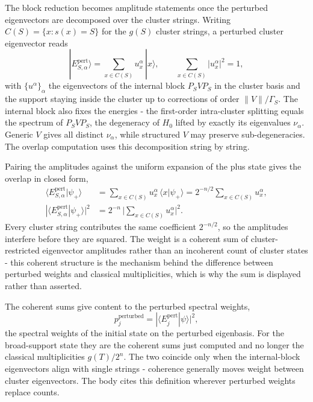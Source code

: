 The block reduction becomes amplitude statements once the perturbed eigenvectors are decomposed over the cluster strings. Writing $C(S) = \{ x : s(x) = S \}$ for the $g(S)$ cluster strings, a perturbed cluster eigenvector reads
\begin{equation*}
|E_{S,\alpha}^{\mathrm{pert}}\rangle = \sum_{x \in C(S)} u^{\alpha}_x \, |x\rangle , \qquad
\sum_{x \in C(S)} |u^{\alpha}_x|^2 = 1 ,
\end{equation*}
with $\{u^\alpha\}_\alpha$ the eigenvectors of the internal block $P_S V P_S$ in the cluster basis and the support staying inside the cluster up to corrections of order $\|V\|/\Gamma_S$. The internal block also fixes the energies - the first-order intra-cluster splitting equals the spectrum of $P_S V P_S$, the degeneracy of $H_0$ lifted by exactly its eigenvalues $\nu_\alpha$. Generic $V$ gives all distinct $\nu_\alpha$, while structured $V$ may preserve sub-degeneracies. The overlap computation uses this decomposition string by string.

Pairing the amplitudes against the uniform expansion of the plus state gives the overlap in closed form,
\begin{align*}
\langle E_{S,\alpha}^{\mathrm{pert}} | \psi_+ \rangle
&= \sum_{x \in C(S)} u^{\alpha}_x \, \langle x | \psi_+ \rangle
= 2^{-n/2} \sum_{x \in C(S)} u^{\alpha}_x , \\
|\langle E_{S,\alpha}^{\mathrm{pert}} | \psi_+ \rangle|^2
&= 2^{-n} \, \Big| \sum_{x \in C(S)} u^{\alpha}_x \Big|^2 .
\end{align*}
Every cluster string contributes the same coefficient $2^{-n/2}$, so the amplitudes interfere before they are squared. The weight is a coherent sum of cluster-restricted eigenvector amplitudes rather than an incoherent count of cluster states - this coherent structure is the mechanism behind the difference between perturbed weights and classical multiplicities, which is why the sum is displayed rather than asserted.

The coherent sums give content to the perturbed spectral weights,
\begin{equation*}
p_j^{\mathrm{perturbed}} = |\langle E_j^{\mathrm{pert}} | \psi \rangle|^2 ,
\end{equation*}
the spectral weights of the initial state on the perturbed eigenbasis. For the broad-support state they are the coherent sums just computed and no longer the classical multiplicities $g(T)/2^n$. The two coincide only when the internal-block eigenvectors align with single strings - coherence generally moves weight between cluster eigenvectors. The body cites this definition wherever perturbed weights replace counts.


